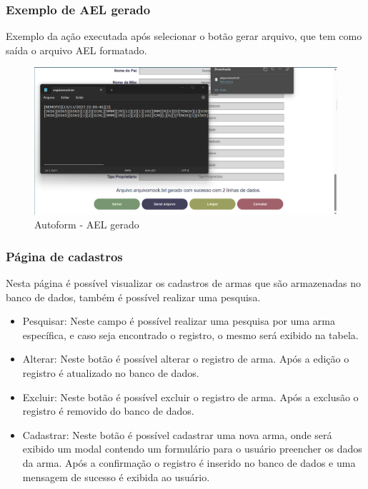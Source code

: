 \subsubsection{Exemplo de AEL gerado}
Exemplo da ação executada após selecionar o botão gerar arquivo, que tem como saída o arquivo AEL formatado.

\begin{figure}[H]
    \caption{\label{fig:tela-ael-gerado}Autoform - AEL gerado}
    \begin{center}
        \includegraphics[scale=0.5]{imagens/autoform-ael-gerado.png}
    \end{center}
\end{figure}

\subsubsection{Página de cadastros}
Nesta página é possível visualizar os cadastros de armas que são armazenadas no banco de dados, também é possível realizar uma pesquisa.
\begin{itemize}
    \item Pesquisar: Neste campo é possível realizar uma pesquisa por uma arma específica, e caso seja encontrado o registro, o mesmo será exibido na tabela.
    \item Alterar: Neste botão é possível alterar o registro de arma. Após a edição o registro é atualizado no banco de dados.
    \item Excluir: Neste botão é possível excluir o registro de arma. Após a exclusão o registro é removido do banco de dados.
    \item Cadastrar: Neste botão é possível cadastrar uma nova arma, onde será exibido um modal contendo um formulário para o usuário preencher os dados da arma. Após a confirmação o registro é inserido no banco de dados e uma mensagem de sucesso é exibida ao usuário.
\end{itemize}

